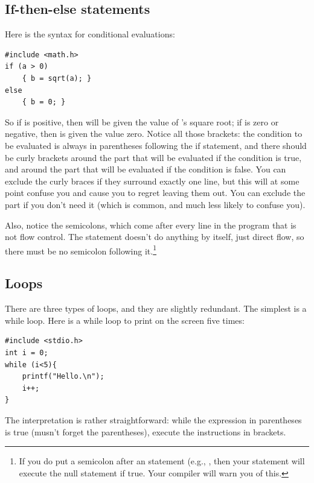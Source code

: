 \documentclass[12pt]{article}
\makeatletter
\def\ttindex#1{\index{#1@\cinline{#1}}}
\makeatother
\begin{document}
\subsection{If-then-else statements} Here is the syntax for conditional evaluations: \ttindex{if}

\begin{lstlisting}
#include <math.h>
if (a > 0)
    { b = sqrt(a); }
else 
    { b = 0; }
\end{lstlisting}
So if  is positive, then  will be given the value of 's square root; if  is
zero or negative, then  is given the value zero. Notice all those brackets: the condition to be
evaluated is always in parentheses following the if statement, and there should be curly brackets around
the part that will be evaluated if the condition is true, and around the part that will be evaluated if
the condition is false. You can exclude the curly braces if they surround exactly one line, but this
will at some point confuse you and cause you to regret leaving them out.
You can exclude the  part if you don't need it (which is common, and much less likely to confuse you).

Also, notice the semicolons, which come after every line in the program that is not flow control. The  statement doesn't do anything by itself, just direct flow, so there must be no semicolon following
it.\footnote{If you do put a semicolon after an  statement
(e.g., , then your  statement will
execute the null statement  if true. Your
compiler will warn you of this.}


\subsection{Loops} There are three types of loops, and they are slightly redundant. The simplest is a while
loop. Here is a while loop to print  on the screen five times:  \ttindex{while}

\begin{lstlisting}
#include <stdio.h>
int i = 0;
while (i<5){
    printf("Hello.\n");
    i++;
}
\end{lstlisting}

The interpretation is rather straightforward: while the expression
in parentheses is true (musn't forget the parentheses), execute the
instructions in brackets.
\end{document}

